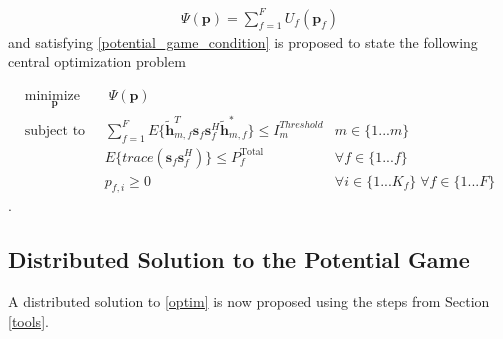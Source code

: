 \begin{gather*} \label{Potential_Function}
\Psi(\mathbf{p}) = \sum_{f = 1}^{F} U_{f}(\mathbf{p}_{f})
\end{gather*}
and satisfying \eqref{potential_game_condition} is proposed to state the following central optimization problem
	
		\begin{subequations}
	\label{optim}
	\begin{align}
	    \underset{\mathbf{p}}{\text{minimize  }}
	    & \; \Psi(\mathbf{p}) \label{potential_game} \\
	    \text{subject to  } \; &
	  \sum^F_{f=1} E\{\tilde{\mathbf{h}}_{m,f}^T  \mathbf{s}_{f} 						
	\mathbf{s}_{f}^{H} \tilde{\mathbf{h}}_{m,f}^* \}\leq I^{Threshold}		
	_{m} & m \in \{1 ...m\} 
		\label{interference_const}\\
        & E\{trace(\mathbf{s}_f\mathbf{s}_f^H)\}  \leq P_{f}^{\text{Total}}  \label{power_const}
        & \forall f \in \{1 ... f\}\\
        & p_{f,i} \geq 0 &  \forall i \in \{1 ...K_{f}\} \; \forall f \in \{1 ... F\}\label{pos_power_const}
	\end{align}
	\end{subequations}.


\subsection{Distributed Solution to the Potential Game}
A distributed solution to \eqref{optim} is now proposed using the steps from Section \ref{tools}.
